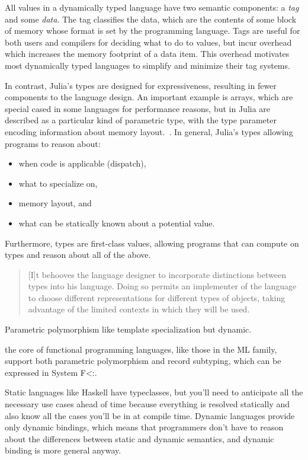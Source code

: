 \documentclass[pldi]{sigplanconf-pldi15}
\begin{document}
All values in a dynamically typed language have two semantic components:
a \emph{tag} and some \emph{data}. The tag classifies the data, which are the
contents of some block of memory whose format is set by the programming
language. Tags are useful for both users and compilers for deciding what to do
to values, but incur overhead which increases the memory footprint of a data
item. This overhead motivates most dynamically typed languages to simplify and
minimize their tag systems.

In contrast, Julia's types are designed for expressiveness, resulting in fewer
components to the language design. An important example is arrays, which are
special cased in some languages for performance reasons, but in Julia are
described as a particular kind of parametric type, with the type parameter
encoding information about memory layout.~\cite{Bezanson2014}. In general,
Julia's types allowing programs to reason about:

\begin{itemize}
\item when code is applicable (dispatch),
\item what to specialize on,
\item memory layout, and
\item what can be statically known about a potential value.
\end{itemize}
%
Furthermore, types are first-class values, allowing programs that can compute
on types and reason about all of the above.

\begin{quote}
	[I]t behooves the language designer to incorporate distinctions between
	types into his language. Doing so permits an implementer of the
	language to choose different representations for different types of
	objects, taking advantage of the limited contexts in which they will be
	used.
\end{quote}

Parametric polymorphism like template specialization but dynamic.

the core of functional programming languages, like those in the ML family, support both parametric polymorphism and record subtyping, which can be expressed in System F<:.

Static languages like Haskell have typeclasses\cite{typeclass}, but you'll need
to anticipate all the necessary use cases ahead of time because everything is
resolved statically and also know all the cases you'll be in at compile time.
Dynamic languages provide only dynamic bindings, which means that programmers
don't have to reason about the differences between static and dynamic
semantics, and dynamic binding is more general anyway.
\end{document}
